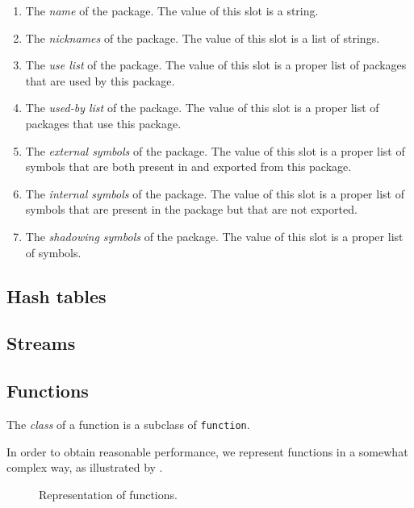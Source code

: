 \begin{enumerate}
\item The \emph{name} of the package.  The value of this slot is a
  string.
\item The \emph{nicknames} of the package.  The value of this slot is
  a list of strings.
\item The \emph{use list} of the package.  The value of this slot is a
  proper list of packages that are used by this package.
\item The \emph{used-by list} of the package.  The value of this slot
is a proper list of packages that use this package.
\item The \emph{external symbols} of the package.  The value of this
  slot is a proper list of symbols that are both present in and
  exported from this package.
\item The \emph{internal symbols} of the package.  The value of this
  slot is a proper list of symbols that are present in the package but
  that are not exported.
\item The \emph{shadowing symbols} of the package.  The value of this
  slot is a proper list of symbols.
\end{enumerate}

\subsection{Hash tables}

\subsection{Streams}

\subsection{Functions}
\label{sec-data-representation-functions}

The \emph{class} of a function is a subclass of \texttt{function}.

In order to obtain reasonable performance, we represent functions in a
somewhat complex way, as illustrated by
.

\begin{figure}
\begin{center}
\end{center}
\caption{\label{fig-function-representation}
Representation of functions.}
\end{figure}

